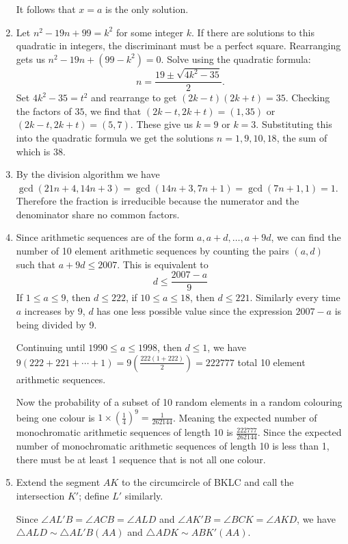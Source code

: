 \documentclass[a4paper]{article}
\begin{document}
\begin{enumerate}
  It follows that $x=a$ is the only solution.
\item Let \(n^2-19n+99=k^2\) for some integer \(k\). If there are solutions to this quadratic in integers, the discriminant must be a perfect square. Rearranging gets us
  \(n^2-19n+(99-k^2)=0\). Solve using the quadratic formula:
  \[n=\frac{19\pm\sqrt{4k^2-35}}{2}.\] Set \(4k^2-35=t^2\) and rearrange to get \((2k-t)(2k+t)=35\). Checking the factors
  of \(35\), we find that \((2k-t,2k+t)=(1,35)\) or \((2k-t,2k+t)=(5,7)\). These give us \(k=9\) or \(k=3\). Substituting this into the quadratic formula we get
  the solutions \(n=1,9,10,18\), the sum of which is \(38\).
\item By the division algorithm we have \(\gcd(21n+4,14n+3)=\gcd(14n+3,7n+1)=\gcd(7n+1,1)=1\). Therefore the fraction is irreducible because the numerator
  and the denominator share no common factors.
\item Since arithmetic sequences are of the form $a, a+d, \ldots, a+9d$, we can find the number of 10 element arithmetic sequences by counting the pairs $(a,d)$ such that $a+9d \le 2007$. This is equivalent to $$d \le \frac{2007-a}{9}$$ If $1 \le a \le 9$, then $d \le 222$, if $10 \le a \le 18$, then $d \le 221$. Similarly every time $a$ increases by $9$, $d$ has one less possible value since the expression $2007-a$ is being divided by 9.

  Continuing until $1990\le a\le 1998$, then $d\le 1$, we have $9(222+221+\cdots+1) = 9(\frac{222(1+222)}{2})=222777$ total 10 element arithmetic sequences.

  Now the probability of a subset of 10 random elements in a random colouring being one colour is $1 \times (\frac{1}{4})^9 = \frac{1}{262144}$. Meaning the expected number of monochromatic arithmetic sequences of length 10 is $\frac{222777}{262144}$. Since the expected number of monochromatic arithmetic sequences of length 10 is less than 1, there must be at least 1 sequence that is not all one colour.

\item Extend the segment $AK$ to the circumcircle of BKLC and call the intersection $K'$; define $L'$ similarly.

  Since $\angle AL'B = \angle ACB = \angle ALD$ and $\angle AK'B = \angle BCK = \angle AKD$, we have $\triangle ALD \sim \triangle AL'B (AA)$ and $\triangle ADK \sim ABK' (AA) $.


\end{enumerate}
\end{document}
